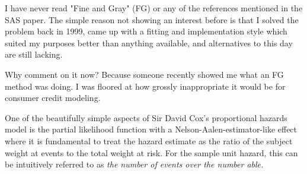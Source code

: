 \documentclass[10pt]{article}
\begin{document}
I have never read "Fine and Gray" (FG) or any of the references mentioned in the SAS paper.
The simple reason not showing an interest before is that I solved the
problem back in 1999,  came up with a fitting and implementation style which suited my purposes better than
anything available, and alternatives to this day are still lacking.

Why comment on it now? Because someone recently 
showed me what an FG method was doing. I was floored at how grossly inappropriate it would be for 
consumer credit modeling.  

One of the beautifully simple aspects of Sir David Cox's proportional hazards model
is the partial likelihood function with a Nelson-Aalen-estimator-like effect where it is fundamental
to treat the hazard estimate as the ratio of the subject weight at events to the total weight at risk.  
For the sample unit hazard, this can be intuitively referred to as {\em the number of events over the number able.}
\end{document}
